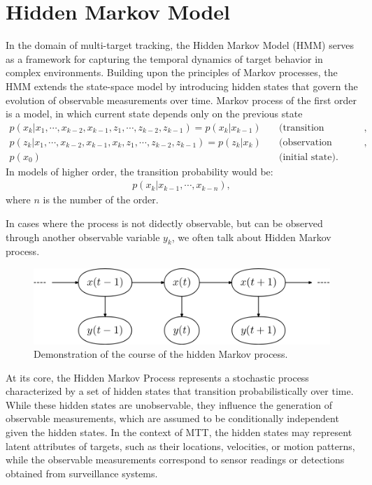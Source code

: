     \section{Hidden Markov Model}
In the domain of multi-target tracking, the Hidden Markov Model (HMM) serves as a framework for
capturing the temporal dynamics of target behavior in complex environments. Building upon the principles of Markov
processes, the HMM extends the state-space model by introducing hidden states that govern the evolution of observable
measurements over time. Markov process of the first order is a model, in which current state depends only on the
previous state
\begin{align}
    p(x_k|x_1,\cdots,x_{k-2},x_{k-1}, z_1, \cdots, z_{k-2}, z_{k-1}) = p(x_k|x_{k-1}) &\quad \text{(transition
    probability)}, \\
    p(z_k|x_1,\cdots,x_{k-2},x_{k-1}, x_k, z_1, \cdots, z_{k-2}, z_{k-1}) = p(z_k|x_{k}) &\quad \text{(observation
    likelihood)}, \\
    p(x_0)& \quad \text{(initial state)}.
\end{align}
In models of higher order, the transition probability would be:
\begin{align}
    p(x_k|x_{k-1},\cdots,x_{k-n}),
\end{align}
where $n$ is the number of the order.

In cases where the process is not didectly observable, but can be observed through another observable variable $y_k$,
we often talk about Hidden Markov process.
\begin{figure}[h]
    \centering
    \label{fig:hmm}
    \includegraphics[width=13cm]{./text/chapter_01/imgs/hmm}
    \caption{Demonstration of the course of the hidden Markov process.}
\end{figure}

At its core, the Hidden Markov Process represents a stochastic process characterized by a set of hidden states that transition probabilistically over time. While these hidden states are unobservable, they influence the generation of observable measurements, which are assumed to be conditionally independent given the hidden states. In the context of MTT, the hidden states may represent latent attributes of targets, such as their locations, velocities, or motion patterns, while the observable measurements correspond to sensor readings or detections obtained from surveillance systems.

